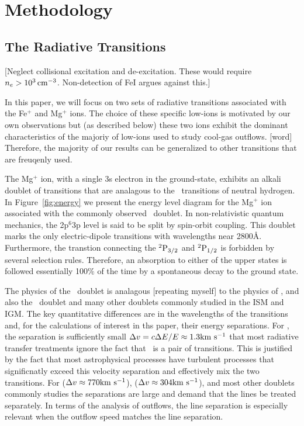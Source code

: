 \documentclass[12pt,preprint]{aastex}
\begin{document}
\section{Methodology}

\subsection{The Radiative Transitions}

[Neglect collisional excitation and de-excitation.  These would
require $n_e > 10^3 \, {\rm cm^{-3}}$.  Non-detection of FeI argues against
this.]

In this paper, we will focus on two sets of radiative transitions
associated with the Fe$^+$ and Mg$^+$ ions.  The choice of these
specific low-ions is motivated by our own observations
\citep{rubin10b} but (as described below) these two ions exhibit
the dominant characteristics of the majoriy of low-ions used to study
cool-gas outflows. [word] Therefore, the majority of our results can
be generalized to other transitions that are freuqenly used.

The Mg$^+$ ion, with a single 3s electron in the ground-state,
exhibits an alkali doublet of transitions that are analagous to the
\lya\ transitions of neutral hydrogen.  In Figure~\ref{fig:energy}
we present the energy level diagram for the Mg$^+$ ion associated with
the commonly observed \mgiid\ doublet.  In non-relativistic quantum
mechanics, the 2p$^6$3p level is said to be split by spin-orbit
coupling.  This doublet marks the only  electric-dipole transitions
with wavelengths near 2800\AA.  Furthermore, the transtion connecting
the $\rm {}^2P_{3/2}$ and $\rm {}^2P_{1/2}$ is forbidden by several
selection rules.  Therefore, an absorption to either of the upper
states is followed essentially 100$\%$ of the time by a spontaneous decay to the
ground state.  

The physics of the \mgiid\ doublet
is analagous [repeating myself] to the physics of 
\lya, and also the \naid\ doublet and many other doublets commonly
studied in the ISM and IGM.  The key quantitative differences are in
the wavelengths of the transitions and, for the calculations of interest
in ths paper, their energy separations.  For  \lya, the
separation is sufficiently small $\Delta v = c \Delta E / E \approx 1.3
{\rm km~s^{-1}}$ that most radiative transfer treatments ignore the fact that
\lya\ is a pair of transitions.   This is justified by the fact that
most astrophysical processes have turbulent processes that
significnatly exceed this velocity separation and effectively mix the
two transitions.  For  ($\Delta v \approx 770 {\rm km~s^{-1}}$),  
 ($\Delta v \approx 304 {\rm km~s^{-1}}$), and most other doublets
commonly studies the separations are large and demand that the lines
be treated separately.  In terms of the analysis of outflows, the line
separation is especially relevant when the outflow speed matches the
line separation.
\end{document}
